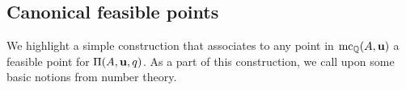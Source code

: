 \documentclass[11pt]{amsart}
\begin{document}




\subsection{Canonical feasible points}  We highlight a simple construction that associates to any point in $\operatorname{mc}_{\mathbb{Q}}(A, \mathbf{u})$ a feasible point for $\Pi(A, \mathbf{u}, q)$.  As a part of this construction, we call upon some basic notions from number theory.   
\end{document}
